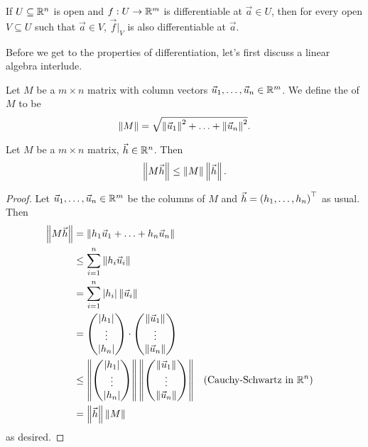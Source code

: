 \documentclass[main.tex]{subfiles}
\begin{document}
\begin{remark}
    If $U\subseteq \mathbb R^n$ is open and $f : U\to \mathbb R^m$ is differentiable at $\vec{a}\in U$, then for every open $V \subseteq U$ such that $\vec{a}\in V$, $\vec{f}|_V$ is also differentiable at $\vec{a}$.
\end{remark}

Before we get to the properties of differentiation, let's first discuss a linear algebra interlude.

\begin{definition}
    Let $M$ be a $m\times n$ matrix with column vectors $\vec{u}_1, \ldots , \vec{u}_n\in \mathbb R^m$. We define the  of $M$ to be
    \[\left\lVert M \right\rVert = \sqrt{\left\lVert \vec{u}_1 \right\rVert^2 + \ldots + \left\lVert \vec{u}_n \right\rVert^2}.\]
\end{definition}

\begin{proposition}
    Let $M$ be a $m\times n$ matrix, $\vec{h}\in \mathbb R^n$. Then
    \[\left\lVert M\vec{h} \right\rVert \le \left\lVert M \right\rVert\left\lVert \vec{h} \right\rVert.\]
\end{proposition}

\begin{proof}
    Let $\vec{u}_1, \ldots , \vec{u}_n\in \mathbb R^m$ be the columns of $M$ and $\vec{h} = \left( h_1, \ldots , h_n \right)^\top$ as usual. Then
    \begin{align*}
        \left\lVert M\vec{h} \right\rVert &= \left\lVert h_1\vec{u}_1 + \ldots + h_n\vec{u}_n \right\rVert \\
        &\le \sum_{i = 1}^n \left\lVert h_i\vec{u}_i \right\rVert \\
        &= \sum_{i = 1}^n \left\lvert h_i \right\rvert\left\lVert \vec{u}_i \right\rVert \\
        &= \begin{pmatrix}
            \left\lvert h_1 \right\rvert \\
            \vdots \\
            \left\lvert h_n \right\rvert
        \end{pmatrix} \cdot \begin{pmatrix}
            \left\lVert \vec{u}_1 \right\rVert \\
            \vdots \\
            \left\lVert \vec{u}_n \right\rVert
        \end{pmatrix} \\
        &\le \left\lVert \begin{pmatrix}
            \left\lvert h_1 \right\rvert \\
            \vdots \\
            \left\lvert h_n \right\rvert
        \end{pmatrix} \right\rVert\left\lVert \begin{pmatrix}
            \left\lVert \vec{u}_1 \right\rVert \\
            \vdots \\
            \left\lVert \vec{u}_n \right\rVert
        \end{pmatrix} \right\rVert && (\text{Cauchy-Schwartz in }\mathbb R^n) \\
        &= \left\lVert \vec{h} \right\rVert\left\lVert M \right\rVert
    \end{align*}
    as desired.
\end{proof}
\end{document}
